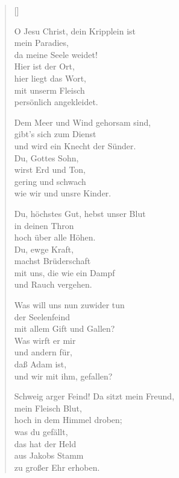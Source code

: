 \begin{multicols}{2}
\settowidth{\versewidth}{ Schweig arger Feind! Da sitzt mein Freund,}
\begin{verse}[\versewidth]

 O Jesu Christ, dein Kripplein ist\\
mein Paradies,\\
da meine Seele weidet!\\
Hier ist der Ort,\\
hier liegt das Wort,\\
mit unserm Fleisch\\
persönlich angekleidet.

 Dem Meer und Wind gehorsam sind,\\
gibt's sich zum Dienst\\
und wird ein Knecht der Sünder.\\
Du, Gottes Sohn,\\
wirst Erd und Ton,\\
gering und schwach\\
wie wir und unsre Kinder.

 Du, höchstes Gut, hebst unser Blut\\
in deinen Thron\\
hoch über alle Höhen.\\
Du, ewge Kraft,\\
machst Brüderschaft\\
mit uns, die wie ein Dampf\\
und Rauch vergehen.

 Was will uns nun zuwider tun\\
der Seelenfeind\\
mit allem Gift und Gallen?\\
Was wirft er mir\\
und andern für,\\
daß Adam ist,\\
und wir mit ihm, gefallen?

 Schweig arger Feind! Da sitzt mein Freund,\\
mein Fleisch Blut,\\
hoch in dem Himmel droben;\\
was du gefällt,\\
das hat der Held\\
aus Jakobs Stamm\\
zu großer Ehr erhoben.


\end{verse}
\end{multicols}
